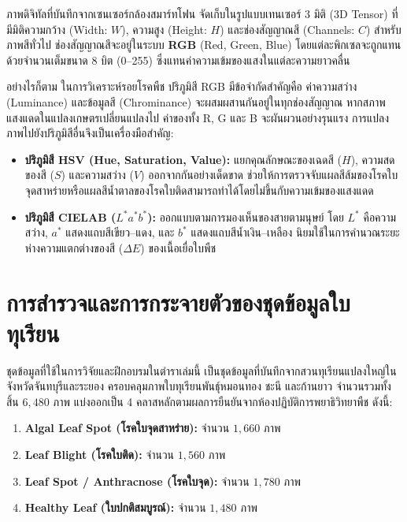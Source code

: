 ภาพดิจิทัลที่บันทึกจากเซนเซอร์กล้องสมาร์ทโฟน จัดเก็บในรูปแบบเทนเซอร์ 3 มิติ (3D Tensor) ที่มีมิติความกว้าง (Width: $W$), ความสูง (Height: $H$) และช่องสัญญาณสี (Channels: $C$) สำหรับภาพสีทั่วไป ช่องสัญญาณสีจะอยู่ในระบบ \textbf{RGB} (Red, Green, Blue) โดยแต่ละพิกเซลจะถูกแทนด้วยจำนวนเต็มขนาด 8 บิต (0--255) ซึ่งแทนค่าความเข้มของแสงในแต่ละความยาวคลื่น

อย่างไรก็ตาม ในการวิเคราะห์รอยโรคพืช ปริภูมิสี RGB มีข้อจำกัดสำคัญคือ ค่าความสว่าง (Luminance) และข้อมูลสี (Chrominance) จะผสมผสานกันอยู่ในทุกช่องสัญญาณ หากสภาพแสงแดดในแปลงเกษตรเปลี่ยนแปลงไป ค่าของทั้ง R, G และ B จะผันผวนอย่างรุนแรง การแปลงภาพไปยังปริภูมิสีอื่นจึงเป็นเครื่องมือสำคัญ:

\begin{itemize}[leftmargin=1.5em, itemsep=2pt]
    \item \textbf{ปริภูมิสี HSV (Hue, Saturation, Value):} แยกคุณลักษณะของเฉดสี ($H$), ความสดของสี ($S$) และความสว่าง ($V$) ออกจากกันอย่างเด็ดขาด ช่วยให้การตรวจจับแผลสีส้มของโรคใบจุดสาหร่ายหรือแผลสีน้ำตาลของโรคใบติดสามารถทำได้โดยไม่ขึ้นกับความเข้มของแสงแดด
    \item \textbf{ปริภูมิสี CIELAB ($L^*a^*b^*$):} ออกแบบตามการมองเห็นของสายตามนุษย์ โดย $L^*$ คือความสว่าง, $a^*$ แสดงแถบสีเขียว--แดง, และ $b^*$ แสดงแถบสีน้ำเงิน--เหลือง นิยมใช้ในการคำนวณระยะห่างความแตกต่างของสี ($\Delta E$) ของเนื้อเยื่อใบพืช
\end{itemize}

\section{การสำรวจและการกระจายตัวของชุดข้อมูลใบทุเรียน}

ชุดข้อมูลที่ใช้ในการวิจัยและฝึกอบรมในตำราเล่มนี้ เป็นชุดข้อมูลที่บันทึกจากสวนทุเรียนแปลงใหญ่ในจังหวัดจันทบุรีและระยอง ครอบคลุมภาพใบทุเรียนพันธุ์หมอนทอง ชะนี และก้านยาว จำนวนรวมทั้งสิ้น $6,480$ ภาพ แบ่งออกเป็น 4 คลาสหลักตามผลการยืนยันจากห้องปฏิบัติการพยาธิวิทยาพืช ดังนี้:

\begin{enumerate}[leftmargin=1.5em, itemsep=2pt]
    \item \textbf{Algal Leaf Spot (โรคใบจุดสาหร่าย):} จำนวน $1,660$ ภาพ
    \item \textbf{Leaf Blight (โรคใบติด):} จำนวน $1,560$ ภาพ
    \item \textbf{Leaf Spot / Anthracnose (โรคใบจุด):} จำนวน $1,780$ ภาพ
    \item \textbf{Healthy Leaf (ใบปกติสมบูรณ์):} จำนวน $1,480$ ภาพ
\end{enumerate}

